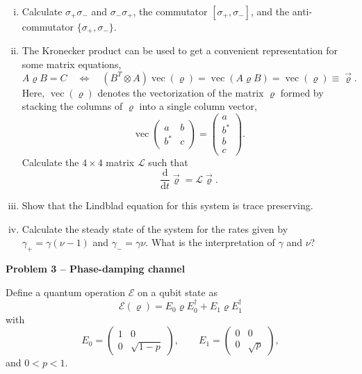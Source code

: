 \documentclass[a4paper,10pt]{article}
\DeclareMathOperator{\vect}{vec}
\newcommand{\Problem}[1]{
  {
  \vspace*{0.5cm}
  \textsf{\textbf{Problem #1}}
  \vspace*{0.2cm}
  
  }
}
\begin{document}
\begin{enumerate}[i)]
\item Calculate $\sigma_+\sigma_-$ and $\sigma_-\sigma_+$, the commutator $[\sigma_+,\sigma_-]$, and the anti-commutator $\{\sigma_+,\sigma_-\}$.
\item The Kronecker product can be used to get a convenient representation for some matrix equations,
\begin{equation}
A\varrho B = C \quad \Leftrightarrow \quad (B^T \otimes A) \vect(\varrho) = \vect(A\varrho B) = \vect(\varrho) \equiv \vec \varrho .
\end{equation}
Here, $\vect(\varrho)$ denotes the vectorization of the matrix $\varrho$ formed by stacking the columns of $\varrho$ into a single column vector,
\begin{equation}
\vect\left(\begin{array}{cc} a & b \\ b^* & c \end{array}\right) = \left(\begin{array}{l} a \\ b^* \\ b \\ c \end{array}\right).
\end{equation}
Calculate the $4\times4$ matrix $\mathcal{L}$ such that
\begin{equation}
\frac{\mathrm{d}}{\mathrm{d}t} \vec\varrho = \mathcal{L}\vec \varrho.
\end{equation}
\item Show that the Lindblad equation for this system is trace preserving.
\item Calculate the steady state of the system for the rates given by $\gamma_+
= \gamma(\nu-1)$ and $\gamma_- = \gamma\nu$.  What is the interpretation of
$\gamma$ and $\nu$?
\end{enumerate}


\Problem{3 -- Phase-damping channel}

Define a quantum operation $\mathcal{E}$ on a qubit state as
\begin{equation}
\mathcal{E}(\varrho) = E_0 \varrho E_0^\dagger + E_1 \varrho E_1^\dagger
\end{equation}
with
\begin{equation}
E_0 = \left(\begin{array}{cc}
1 & 0 \\
0 & \sqrt{1-p}
\end{array}\right), \qquad
E_1 = \left(\begin{array}{cc}
0 & 0 \\
0 & \sqrt{p}
\end{array}\right),
\end{equation}
and $0 < p < 1$.
\end{document}
